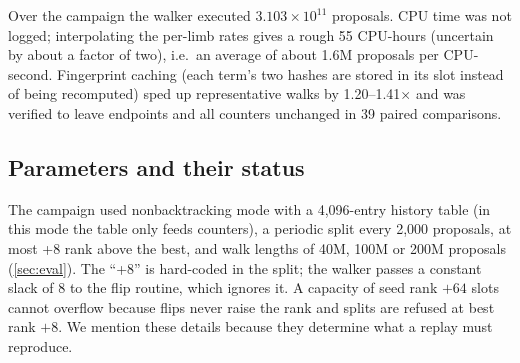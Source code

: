 Over the campaign the walker executed \(3.103\times10^{11}\) proposals. CPU time was not logged; interpolating the per-limb rates gives a rough
55 CPU-hours (uncertain by about a factor of two), i.e.\ an average of about 1.6M proposals per CPU-second.
Fingerprint caching (each term's two hashes are stored in its slot instead of being recomputed) sped up representative walks by 1.20--1.41$\times$ and was verified to leave endpoints and all counters
unchanged in 39 paired comparisons.

\subsection{Parameters and their status}
The campaign used nonbacktracking mode with a 4{,}096-entry history table (in this mode the table only feeds counters), a periodic split every 2{,}000 proposals, at most +8 rank above the best, and walk lengths of 40M, 100M or 200M proposals
(\cref{sec:eval}). The ``+8'' is hard-coded in the split; the walker passes a constant slack of 8 to the flip routine, which ignores it. A capacity of seed rank $+64$ slots cannot overflow because flips never
raise the rank and splits are refused at best rank $+8$. We mention these details because they determine what a replay must reproduce.
